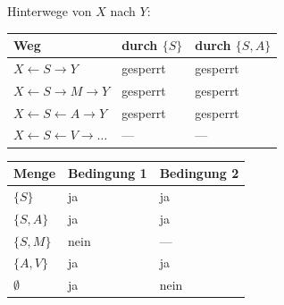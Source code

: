 \begin{merksatz}
Hinterwege von $X$ nach $Y$:
\begin{center}
{\small
\renewcommand{\arraystretch}{1.46}
\begin{tabular}{@{}P{3.4cm}P{2.2cm}P{2.4cm}@{}}
\toprule
\textbf{Weg} & \textbf{durch $\{S\}$} & \textbf{durch $\{S,A\}$}\\
\midrule
$X \leftarrow S \to Y$ & gesperrt & gesperrt\\
$X \leftarrow S \to M \to Y$ & gesperrt & gesperrt\\
$X \leftarrow S \leftarrow A \to Y$ & gesperrt & gesperrt\\
$X \leftarrow S \leftarrow V \to \ldots$ & --- & ---\\
\bottomrule
\end{tabular}}
\end{center}

\begin{center}
{\small
\renewcommand{\arraystretch}{1.5}
\begin{tabular}{@{}P{2.4cm}P{2.6cm}P{2.6cm}@{}}
\toprule
\textbf{Menge} & \textbf{Bedingung 1} & \textbf{Bedingung 2}\\
\midrule
$\{S\}$ & \textcolor{gruen}{ja} & \textcolor{gruen}{ja}\\
$\{S,A\}$ & \textcolor{gruen}{ja} & \textcolor{gruen}{ja}\\
$\{S,M\}$ & \textcolor{akzent}{nein} & ---\\
$\{A,V\}$ & \textcolor{gruen}{ja} & \textcolor{gruen}{ja}\\
$\emptyset$ & \textcolor{gruen}{ja} & \textcolor{akzent}{nein}\\
\bottomrule
\end{tabular}}
\end{center}

\begin{center}
\begin{minipage}{0.88\textwidth}
\end{minipage}
\end{center}
\end{merksatz}

